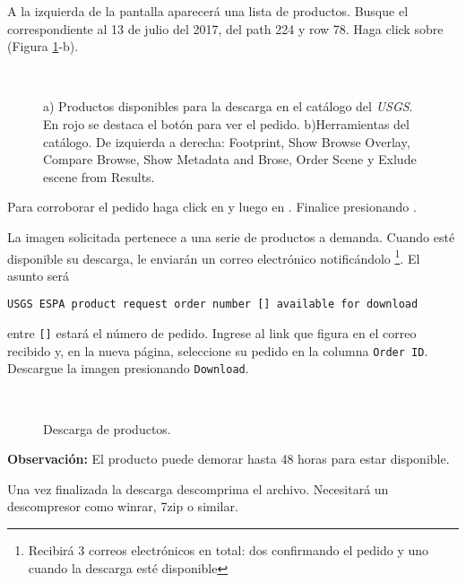 A la izquierda de la pantalla aparecerá una lista de productos. Busque el correspondiente al 13 de julio del 2017, del path 224 y row 78. Haga click sobre  (Figura \ref{fig:descarga}-b).

\begin{figure}[H]
    \centering
    \\
    \caption{a) Productos disponibles para la descarga en el catálogo del \emph{USGS}. En rojo se destaca el botón para ver el pedido. b)Herramientas del catálogo. De izquierda a derecha: Footprint, Show Browse Overlay, Compare Browse, Show Metadata and Brose, Order Scene y Exlude escene from Results.}
    \label{fig:descarga}
\end{figure}

Para corroborar el pedido haga click en  y luego en . Finalice presionando .

La imagen solicitada pertenece a una serie de productos a demanda.  Cuando  esté disponible su descarga, le enviarán un correo electrónico notificándolo \footnote{Recibirá 3 correos electrónicos en total: dos confirmando el pedido y uno cuando la descarga esté disponible}. El asunto será

\begin{center}
\texttt{USGS ESPA product request order number [] available for download}
\end{center}

entre \texttt{[]} estará el número de pedido. Ingrese al link que figura en el correo recibido y, en la nueva página, seleccione su pedido en la columna \texttt{Order ID}. Descargue la imagen presionando \texttt{Download}.

\begin{figure}[h!]
    \centering
    \\
    \caption{Descarga de productos.}
    \label{fig:descarga2}
\end{figure}

\textbf{Observación:} El producto puede demorar hasta 48 horas para estar disponible.

Una vez finalizada la descarga descomprima el archivo. Necesitará un descompresor como winrar, 7zip o similar.

